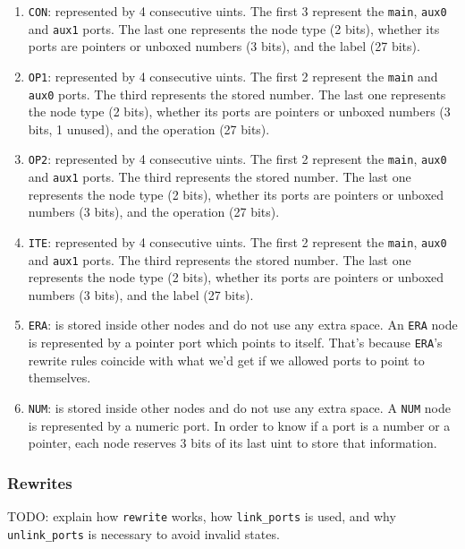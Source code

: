 \documentclass{article}
\theoremstyle{definition}
\theoremstyle{theorem}
\begin{document}
\begin{enumerate}
  \item \verb|CON|: represented by 4 consecutive uints. The first 3 represent
  the \verb|main|, \verb|aux0| and \verb|aux1| ports. The last one represents
  the node type (2 bits), whether its ports are pointers or unboxed numbers (3
  bits), and the label (27 bits).

  \item \verb|OP1|: represented by 4 consecutive uints. The first 2 represent
  the \verb|main| and \verb|aux0| ports. The third represents the stored number.
  The last one represents the node type (2 bits), whether its ports are pointers
  or unboxed numbers (3 bits, 1 unused), and the operation (27 bits).

  \item \verb|OP2|: represented by 4 consecutive uints. The first 2 represent
  the \verb|main|, \verb|aux0| and \verb|aux1| ports. The third represents the
  stored number. The last one represents the node type (2 bits), whether its
  ports are pointers or unboxed numbers (3 bits), and the operation (27 bits).

  \item \verb|ITE|: represented by 4 consecutive uints. The first 2 represent
  the \verb|main|, \verb|aux0| and \verb|aux1| ports. The third represents the
  stored number. The last one represents the node type (2 bits), whether its
  ports are pointers or unboxed numbers (3 bits), and the label (27 bits).

  \item \verb|ERA|: is stored inside other nodes and do not use any extra space.
  An \verb|ERA| node is represented by a pointer port which points to itself.
  That's because \verb|ERA|'s rewrite rules coincide with what we'd get if we
  allowed ports to point to themselves.

  \item \verb|NUM|: is stored inside other nodes and do not use any extra space.
  A \verb|NUM| node is represented by a numeric port. In order to know if a port
  is a number or a pointer, each node reserves 3 bits of its last uint to store
  that information.
\end{enumerate}

\subsubsection{Rewrites}

TODO: explain how \verb|rewrite| works, how \verb|link_ports| is used, and why
\verb|unlink_ports| is necessary to avoid invalid states.
\end{document}
